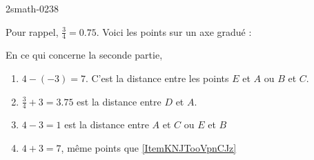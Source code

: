 
\begin{corrige}{2smath-0238}

    Pour rappel, \( \frac{ 3 }{ 4 }=0.75\). Voici les points sur un axe gradué :
\begin{center}
   
\end{center}

En ce qui concerne la seconde partie,
\begin{enumerate}
    \item   \label{ItemKNJTooVpnCJz}
        \( 4-(-3)=7\). C'est la distance entre les points \( E\) et \( A\) ou \( B\) et \( C\).
    \item
        \( \frac{ 3 }{ 4 }+3=3.75\) est la distance entre \( D\) et \( A\).
    \item
        \( 4-3=1\) est la distance entre \( A\) et \( C\) ou \( E\) et \( B\)
    \item
        \( 4+3=7\), même points que \ref{ItemKNJTooVpnCJz}
\end{enumerate}

\end{corrige}
